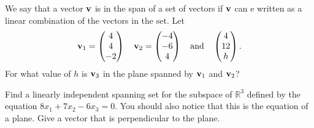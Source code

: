 \begin{problem}
    We say that a vector ${\bf v}$ is in the span of a set of vectors if ${\bf v}$ can e written
    as a linear combination of the vectors in the set.  Let
    \[ {\bf v}_1 = \begin{pmatrix} 4 \\ 4 \\ -2 \end{pmatrix} \quad {\bf v}_2 = \begin{pmatrix} -4
            \\ -6 \\ 4 \end{pmatrix} \quad \text{and} \quad \begin{pmatrix} 4 \\ 12 \\ h
            \end{pmatrix}. \]
    For what value of $h$ is ${\bf v}_3$ in the plane spanned by ${\bf v}_1$ and ${\bf v}_2$?
\end{problem}

\begin{problem}
    Find a linearly independent spanning set for the subspace of $\mathbb{R}^3$ defined by
    the equation $8x_1 + 7x_2 - 6x_3 = 0$.  You should also notice that this is the
    equation of a plane.  Give a vector that is perpendicular to the plane.
\end{problem}

